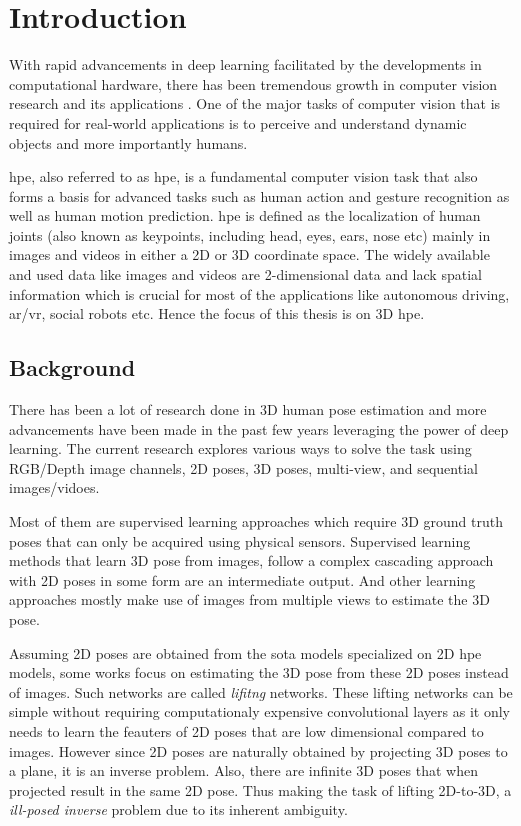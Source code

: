 \chapter{Introduction}
\label{chap:introduction}
With rapid advancements in deep learning facilitated by the developments in computational hardware, there has been tremendous growth in computer vision research and its applications \cite{AIandCompute}. One of the major tasks of computer vision that is required for real-world applications is to perceive and understand dynamic objects and more importantly humans.

\acl{hpe}, also referred to as \ac{hpe}, is a fundamental computer vision task that also forms a basis for advanced tasks such as human action and gesture recognition as well as human motion prediction. \ac{hpe} is defined as the localization of human joints (also known as keypoints, including head, eyes, ears, nose etc) mainly in images and videos in either a 2D or 3D coordinate space. The widely available and used data like images and videos are 2-dimensional data and lack spatial information which is crucial for most of the applications like autonomous driving, \ac{ar/vr}, social robots etc. Hence the focus of this thesis is on 3D \ac{hpe}.

\section{Background}
\label{sec:background}

There has been a lot of research done in 3D human pose estimation and more advancements have been made in the past few years leveraging the power of deep learning. The current research explores various ways to solve the task using RGB/Depth image channels, 2D poses, 3D poses, multi-view, and sequential images/vidoes. 

Most of them are supervised learning approaches which require 3D ground truth poses that can only be acquired using physical sensors. Supervised learning methods that learn 3D pose from images, follow a complex cascading approach with 2D poses in some form are an intermediate output. And other learning approaches mostly make use of images from multiple views to estimate the 3D pose. 

Assuming 2D poses are obtained from the \ac{sota} models specialized on 2D \ac{hpe} models, some works focus on estimating the 3D pose from these 2D poses instead of images. Such networks are called \textit{lifitng} networks. These lifting networks can be simple without requiring computationaly expensive convolutional layers as it only needs to learn the feauters of 2D poses that are low dimensional compared to images. However since 2D poses are naturally obtained by projecting 3D poses to a plane, it is an inverse problem. Also, there are infinite 3D poses that when projected result in the same 2D pose. Thus making the task of lifting 2D-to-3D, a \textit{ill-posed inverse} problem due to its inherent ambiguity.

